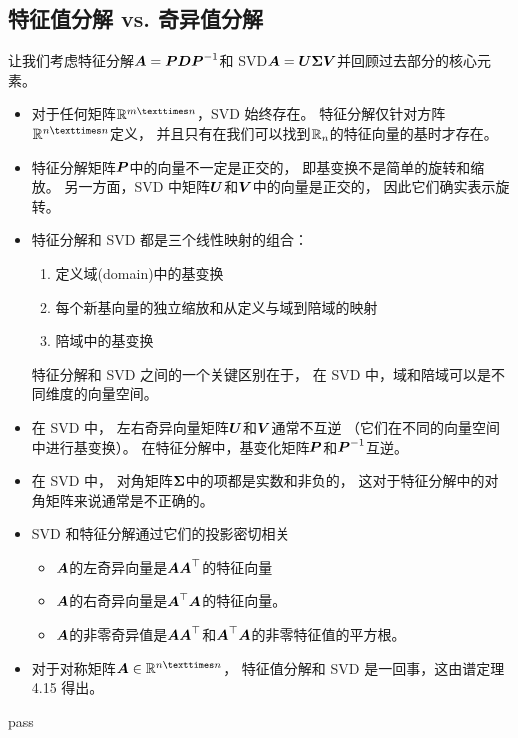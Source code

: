 \subsection{特征值分解 vs. 奇异值分解}
让我们考虑特征分解$\A = \P\D\P^{-1}$和
SVD$\A = \U\bs{\Sigma}\V$并回顾过去部分的核心元素。
\begin{itemize}
    \item
    对于任何矩阵$\R^{m×n}$，SVD 始终存在。
    特征分解仅针对方阵$\R^{n×n}$定义，
    并且只有在我们可以找到$\R_n$的特征向量的基时才存在。
    \item
    特征分解矩阵$\P$中的向量不一定是正交的，
    即基变换不是简单的旋转和缩放。
    另一方面，SVD 中矩阵$\U$和$\V$中的向量是正交的，
    因此它们确实表示旋转。
    \item
    特征分解和 SVD 都是三个线性映射的组合：
    \begin{enumerate}
        \item 定义域(domain)中的基变换
        \item 每个新基向量的独立缩放和从定义与域到陪域的映射
        \item 陪域中的基变换
    \end{enumerate}
    特征分解和 SVD 之间的一个关键区别在于，
    在 SVD 中，域和陪域可以是不同维度的向量空间。
    \item
    在 SVD 中，
    左右奇异向量矩阵$\U$和$\V$通常不互逆
    （它们在不同的向量空间中进行基变换）。
    在特征分解中，基变化矩阵$\P$和$\P^{-1}$互逆。
    \item
    在 SVD 中，
    对角矩阵$\bs{\Sigma}$中的项都是实数和非负的，
    这对于特征分解中的对角矩阵来说通常是不正确的。
    \item
    SVD 和特征分解通过它们的投影密切相关
    \begin{itemize}
        \item $\A$的左奇异向量是$\A\A^\top$的特征向量
        \item $\A$的右奇异向量是$\A^\top\A$的特征向量。
        \item $\A$的非零奇异值是$\A\A^\top$和$\A^\top \A$的非零特征值的平方根。
    \end{itemize}
    \item
    对于对称矩阵$\A \in \R^{n×n}$，
    特征值分解和 SVD 是一回事，这由谱定理 4.15 得出。
\end{itemize}

\begin{example}[在电影评级和消费者中寻找结构]
    pass
\end{example}

